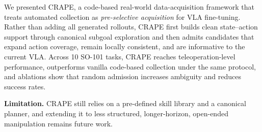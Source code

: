 \documentclass{article}
\begin{document}
We presented CRAPE, a code-based real-world data-acquisition framework that treats automated collection as \emph{pre-selective acquisition} for VLA fine-tuning. 
Rather than adding all generated rollouts, CRAPE first builds clean state--action support through canonical subgoal exploration and then admits candidates that expand action coverage, remain locally consistent, and are informative to the current VLA. 
Across 10 SO-101 tasks, CRAPE reaches teleoperation-level performance, outperforms vanilla code-based collection under the same protocol, and ablations show that random admission increases ambiguity and reduces success rates.

\textbf{Limitation.} CRAPE still relies on a pre-defined skill library and a canonical planner, and extending it to less structured, longer-horizon, open-ended manipulation remains future work.%





\clearpage
\end{document}
